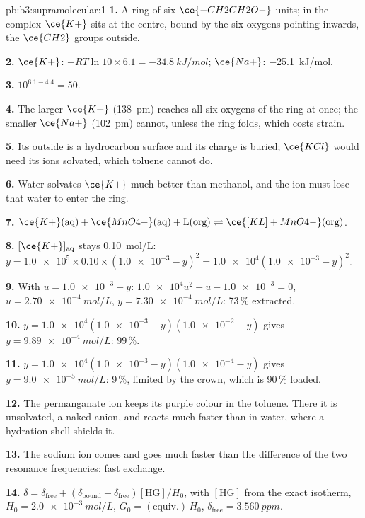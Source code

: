 \begin{solution}{pb:b3:supramolecular:1}
\textbf{1.} A ring of six $\ce{-CH2CH2O-}$ units; in the complex $\ce{K+}$ sits at the centre, bound by the
six oxygens pointing inwards, the $\ce{CH2}$ groups outside.

\textbf{2.} $\ce{K+}$: $-RT\ln 10 \times 6.1 = \qty{-34.8}{kJ/mol}$; $\ce{Na+}$: \qty{-25.1}{kJ/mol}.

\textbf{3.} $10^{6.1 - 4.4} = 50$.

\textbf{4.} The larger $\ce{K+}$ (\qty{138}{pm}) reaches all six oxygens of the ring at once; the
smaller $\ce{Na+}$ (\qty{102}{pm}) cannot, unless the ring folds, which costs strain.

\textbf{5.} Its outside is a hydrocarbon surface and its charge is buried; $\ce{KCl}$
would need its ions solvated, which toluene cannot do.

\textbf{6.} Water solvates $\ce{K+}$ much better than methanol, and the ion must lose that
water to enter the ring.

\textbf{7.} $\ce{K+}(\text{aq}) + \ce{MnO4-}(\text{aq}) + \mathrm L(\text{org}) \rightleftharpoons \ce{[KL]+MnO4-}(\text{org})$.

\textbf{8.} $[\ce{K+}]_{\mathrm{aq}}$ stays \qty{0.10}{mol/L}: $y = \num{1.0e5} \times 0.10 \times (\num{1.0e-3} - y)^2 = \num{1.0e4}(\num{1.0e-3} - y)^2$.

\textbf{9.} With $u = \num{1.0e-3} - y$: $\num{1.0e4}u^2 + u - \num{1.0e-3} = 0$, $u = \qty{2.70e-4}{mol/L}$, $y = \qty{7.30e-4}{mol/L}$: 73\,\%
extracted.

\textbf{10.} $y = \num{1.0e4}(\num{1.0e-3} - y)(\num{1.0e-2} - y)$ gives $y = \qty{9.89e-4}{mol/L}$: 99\,\%.

\textbf{11.} $y = \num{1.0e4}(\num{1.0e-3} - y)(\num{1.0e-4} - y)$ gives $y = \qty{9.0e-5}{mol/L}$: 9\,\%, limited by the crown,
which is 90\,\% loaded.

\textbf{12.} The permanganate ion keeps its purple colour in the toluene. There
it is unsolvated, a naked anion, and reacts much faster than in water, where a
hydration shell shields it.

\textbf{13.} The sodium ion comes and goes much faster than the difference of the
two resonance frequencies: fast exchange.

\textbf{14.} $\delta = \delta_{\mathrm{free}} + (\delta_{\mathrm{bound}} - \delta_{\mathrm{free}})[\mathrm{HG}]/H_0$, with $[\mathrm{HG}]$ from the exact isotherm, $H_0 = \qty{2.0e-3}{mol/L}$,
$G_0 = (\text{equiv.})\,H_0$, $\delta_{\mathrm{free}} = \qty{3.560}{ppm}$.


\end{solution}
